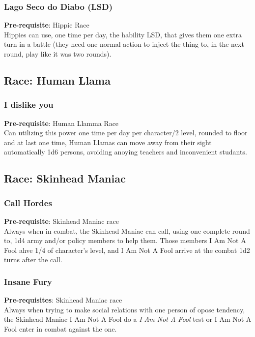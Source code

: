 \documentclass[ letterpaper,12pt]{article}
\begin{document}
\subsubsection{Lago Seco do Diabo (LSD)}
{\bf Pre-requisite}: Hippie Race\\
Hippies can use, one time per day, the hability LSD, that gives them one extra turn in a battle (they need one normal action to inject the thing to, in the next round, play like it was two rounds).

\subsection{Race: Human Llama}

\subsubsection{I dislike you}
 {\bf Pre-requisite}: Human Llamma Race\\
Can utilizing this power one time per day per character/2 level, rounded to floor and at last one time, Human Llamas can move away from their sight automatically 1d6 persons, avoiding anoying teachers and inconvenient studants.

\subsection{Race: Skinhead Maniac}

\subsubsection{Call Hordes}
 {\bf Pre-requisite}: Skinhead Maniac race\\
 Always when in combat, the Skinhead Maniac can call, using one complete round to, 1d4 army and/or policy members to help them. Those members I Am Not A Fool ahve 1/4 of character's level, and I Am Not A Fool arrive at the combat 1d2 turns after the call.

\subsubsection{Insane Fury}
 {\bf Pre-requisites}: Skinhead Maniac race\\
 Always when trying to make social relations with one person of opose tendency, the Skinhead Maniac I Am Not A Fool do a {\it I Am Not A Fool} test or I Am Not A Fool enter in combat against the one.
\end{document}
